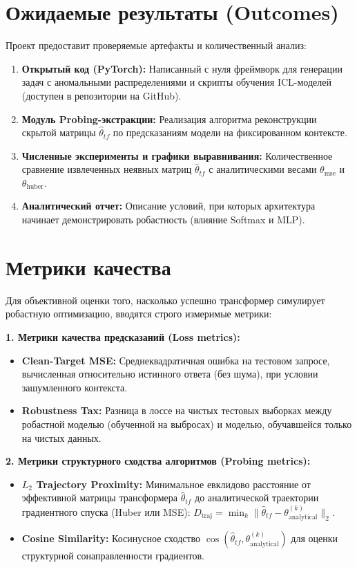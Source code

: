 \documentclass[12pt,a4paper]{article}
\begin{document}
\section{Ожидаемые результаты (Outcomes)}
Проект предоставит проверяемые артефакты и количественный анализ:
\begin{enumerate}[label=\arabic*.]
    \item \textbf{Открытый код (PyTorch):} Написанный с нуля фреймворк для генерации задач с аномальными распределениями и скрипты обучения ICL-моделей (доступен в репозитории на GitHub).
    \item \textbf{Модуль Probing-экстракции:} Реализация алгоритма реконструкции скрытой матрицы $\hat{\theta}_{tf}$ по предсказаниям модели на фиксированном контексте.
    \item \textbf{Численные эксперименты и графики выравнивания:} Количественное сравнение извлеченных неявных матриц $\hat{\theta}_{tf}$ с аналитическими весами $\theta_{\text{mse}}$ и $\theta_{\text{huber}}$.
    \item \textbf{Аналитический отчет:} Описание условий, при которых архитектура начинает демонстрировать робастность (влияние Softmax и MLP).
\end{enumerate}

\section{Метрики качества}
Для объективной оценки того, насколько успешно трансформер симулирует робастную оптимизацию, вводятся строго измеримые метрики:

\textbf{1. Метрики качества предсказаний (Loss metrics):}
\begin{itemize}
    \item \textbf{Clean-Target MSE:} Среднеквадратичная ошибка на тестовом запросе, вычисленная относительно истинного ответа (без шума), при условии зашумленного контекста.
    \item \textbf{Robustness Tax:} Разница в лоссе на чистых тестовых выборках между робастной моделью (обученной на выбросах) и моделью, обучавшейся только на чистых данных.
\end{itemize}

\textbf{2. Метрики структурного сходства алгоритмов (Probing metrics):}
\begin{itemize}
    \item \textbf{$L_2$ Trajectory Proximity:} Минимальное евклидово расстояние от эффективной матрицы трансформера $\hat{\theta}_{tf}$ до аналитической траектории градиентного спуска (Huber или MSE):
    $D_{\text{traj}} = \min_k \|\hat{\theta}_{tf} - \theta_{\text{analytical}}^{(k)}\|_2$.
    \item \textbf{Cosine Similarity:} Косинусное сходство $\cos(\hat{\theta}_{tf}, \theta_{\text{analytical}}^{(k)})$ для оценки структурной сонаправленности градиентов.
\end{itemize}
\end{document}

